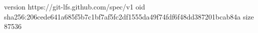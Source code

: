 version https://git-lfs.github.com/spec/v1
oid sha256:206cede641a685f5b7c1bf7af5fc2df1555da49f74fdf6f48dd387201bcab84a
size 87536
